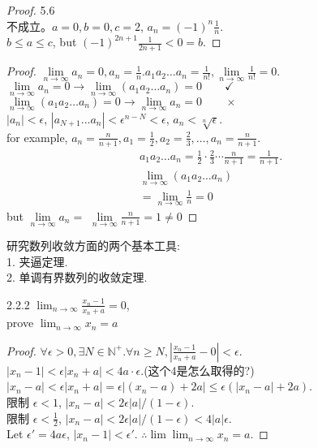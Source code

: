 \begin{proof}5.6\\
	不成立。$ a=0,b=0,c=2 $, $ a_n = (-1)^n\frac{1}{n} $.\\
	$ b\leqslant a\leqslant c $, but $ (-1)^{2n+1}\frac{1}{2n+1}<0=b $.
\end{proof}
\begin{proof}
	$ \lim\limits_{n\rightarrow\infty}a_n=0, a_n = \frac{1}{n} $.$ a_1a_2\dots a_n = \frac{1}{n!}, \lim\limits_{n\rightarrow\infty}\frac{1}{n!}=0 $.\\
	$ \lim\limits_{n\rightarrow\infty}a_n=0 \rightarrow \lim\limits_{n\rightarrow\infty}(a_1a_2\dots a_n)=0 \qquad\checkmark$\\
	$ \lim\limits_{n\rightarrow\infty}(a_1a_2\dots a_n)=0 \rightarrow \lim\limits_{n\rightarrow\infty}a_n=0 \qquad\times$\\
	$ |a_n|<\epsilon $, $ |a_{N+1}\dots a_n|<\epsilon^{n-N}<\epsilon $,	$ a_n <\sqrt[n]{\epsilon} $.\\
	for example, $ a_n = \frac{n}{n+1}, a_1 = \frac{1}{2}, a_2=\frac{2}{3},\dots,a_n=\frac{n}{n+1} $.\\
	\begin{align*}
	 a_1a_2\dots a_n = \frac{1}{2}\cdot\frac{2}{3}\cdots\frac{n}{n+1} = \frac{1}{n+1} . \\
	\lim\limits_{n\rightarrow\infty}
	(a_1a_2\dots a_n) \\=  
	\lim\limits_{n\rightarrow\infty}
	\frac{1}{n}
	=0
\end{align*}	
but $ 	\lim\limits_{n\rightarrow\infty}a_n=$  $	\lim\limits_{n\rightarrow\infty}
\frac{n}{n+1} = 1 \neq 0  $
\end{proof}

研究数列收敛方面的两个基本工具:\\
1. 夹逼定理.\\
2. 单调有界数列的收敛定理.

\begin{example}2.2.2
	$ \lim_{n\rightarrow\infty}\frac{x_n-1}{x_n+a} = 0 $, \\
	prove $ \lim_{n\rightarrow\infty}x_n=a $
\end{example}
\begin{proof}
	$\forall \epsilon >0, \exists N \in \mathbb{N}^+. \forall n \geqslant N, |\frac{x_n-1}{x_n+a}- 0| < \epsilon$.\\
	$ |{x_n-1}|< \epsilon|{x_n+a}| < 4a\cdot \epsilon $.(这个4是怎么取得的?)\\
	$ |x_n-a|<\epsilon|x_n+a| = \epsilon|(x_n-a)+2a|\leqslant \epsilon(|x_n-a|+2a) $.\\
	限制 $ \epsilon<1 $, $ |x_n-a|<2\epsilon|a|/(1-\epsilon) $.\\
	限制 $ \epsilon<\frac{1}{2} $, $ |x_n-a|<2\epsilon|a|/(1-\epsilon)<4|a|\epsilon $.\\
	Let $ \epsilon'=4a\epsilon  $, $ |{x_n-1}|<\epsilon' $. $ \therefore \lim\lim_{n\rightarrow\infty}x_n = a $.	
\end{proof}

